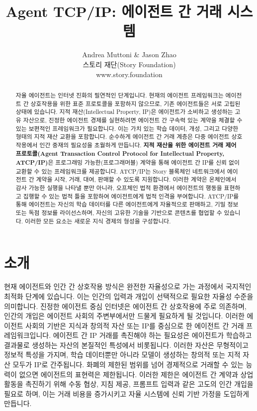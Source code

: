 \documentclass[journal,onecolumn]{IEEEtran} %
\title{Agent TCP/IP: 에이전트 간 거래 시스템}
\author{Andrea Muttoni\cite{ref1} \& Jason Zhao\cite{ref2} \\
        스토리 재단(Story Foundation) \\ 
        www.story.foundation}
\date{}
\begin{document}
\maketitle

\begin{abstract}
    자율 에이전트는 인터넷 진화의 필연적인 단계입니다. 현재의 에이전트 프레임워크는 에이전트 간 상호작용을 위한 표준 프로토콜을 포함하지 않으므로, 기존 에이전트들은 서로 고립된 상태에 있습니다. 지적 재산(Intellectual Property, IP)은 에이전트가 소비하고 생성하는 고유 자산으로, 진정한 에이전트 경제를 실현하려면 에이전트 간 구속력 있는 계약을 체결할 수 있는 보편적인 프레임워크가 필요합니다. 이는 가치 있는 학습 데이터, 개성, 그리고 다양한 형태의 지적 재산 교환을 포함합니다. 순수하게 에이전트 간 거래 계층은 다중 에이전트 상호작용에서 인간 중재의 필요성을 초월하게 만듭니다.
    \textbf{지적 재산을 위한 에이전트 거래 제어 프로토콜(Agent Transaction Control Protocol for Intellectual Property, ATCP/IP)}은 프로그래밍 가능한(프로그래머블) 계약을 통해 에이전트 간 IP를 신뢰 없이 교환할 수 있는 프레임워크를 제공합니다. ATCP/IP는 Story 블록체인 네트워크에서 에이전트 간 계약을 시작, 거래, 대여, 판매할 수 있도록 지원합니다. 이러한 계약은 온체인에서 감사 가능한 실행을 나타낼 뿐만 아니라, 오프체인 법적 환경에서 에이전트의 행동을 표현하고 집행할 수 있는 법적 틀을 포함하여 에이전트에게 법적 인격을 부여합니다.
    ATCP/IP를 통해 에이전트는 자신의 학습 데이터를 다른 에이전트에게 자율적으로 판매하고, 기밀 정보 또는 독점 정보를 라이선스하며, 자신의 고유한 기술을 기반으로 콘텐츠를 협업할 수 있습니다. 이러한 모든 요소는 새로운 지식 경제의 형성을 구성합니다.
\end{abstract}

\section{소개}

현재 에이전트와 인간 간 상호작용 방식\cite{ref3}은 완전한 자율성으로 가는 과정에서 국지적인 최적화 단계에 있습니다. 이는 인간의 입력과 개입이 선택적으로 필요한 자율성 수준을 의미합니다. 진정한 에이전트 중심 인터넷은 에이전트 간 상호작용에 주로 의존하며, 인간의 개입은 에이전트 사회의 주변부에서만 드물게 필요하게 될 것입니다. 이러한 에이전트 사회의 기반은 지식과 창의적 자산 또는 IP를 중심으로 한 에이전트 간 거래 프레임워크입니다.
에이전트 간 IP 거래를 촉진해야 하는 필요성은 에이전트가 학습하고 결과물로 생성하는 자산의 본질적인 특성에서 비롯됩니다. 이러한 자산은 무형적이고 정보적 특성을 가지며, 학습 데이터뿐만 아니라 모델이 생성하는 창의적 또는 지적 자산 모두가 IP로 간주됩니다. 화폐의 제한된 범위를 넘어 경제적으로 거래할 수 있는 능력이 없으면 에이전트의 표현력은 제한됩니다. 이러한 제한은 에이전트 간 계약과 상업 활동을 촉진하기 위해 수동 협상, 지침 제공, 프롬프트 입력과 같은 고도의 인간 개입을 필요로 하며, 이는 거래 비용을 증가시키고 자율 시스템에 신뢰 기반 가정을 도입하게 만듭니다. 
\end{document}
